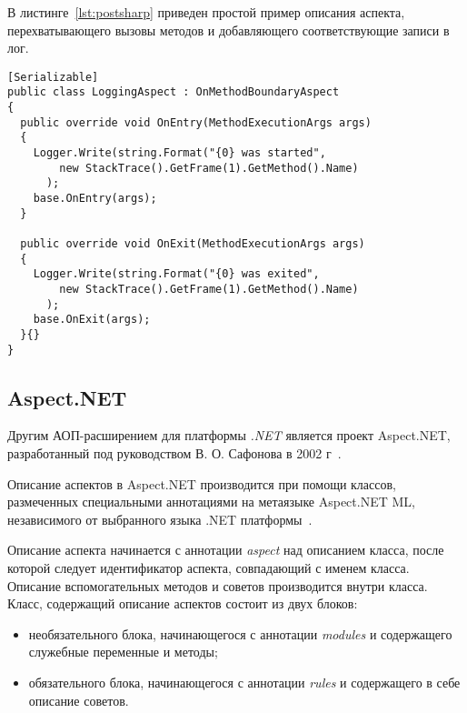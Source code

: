   В листинге~\ref{lst:postsharp} приведен простой пример описания аспекта, 
  перехватывающего вызовы методов и добавляющего соответствующие записи в лог.
  \begin{lstlisting}[style={java},  label={lst:postsharp}, caption={Пример 
  описания аспекта при помощи PostSharp.}]
[Serializable]
public class LoggingAspect : OnMethodBoundaryAspect
{
  public override void OnEntry(MethodExecutionArgs args)
  {
    Logger.Write(string.Format("{0} was started",
        new StackTrace().GetFrame(1).GetMethod().Name)
      );
    base.OnEntry(args);
  }
 
  public override void OnExit(MethodExecutionArgs args)
  {
    Logger.Write(string.Format("{0} was exited",
        new StackTrace().GetFrame(1).GetMethod().Name)
      );
    base.OnExit(args);
  }{}
}
  \end{lstlisting}
\subsection{Aspect.NET}
\label{sub:aspect_net_overwiev}
Другим АОП-расширением для платформы \textit{.NET} является проект Aspect.NET, разработанный под руководством В. О. Сафонова в 2002 г~\cite{aspect_net_logging}.

Описание аспектов в Aspect.NET производится при помощи классов, размеченных специальными аннотациями на метаязыке Aspect.NET ML, независимого от выбранного языка .NET платформы~\cite{aspect_net_safonov_2003,aspect_net_safonov_2004}.

Описание аспекта начинается с аннотации \textit{aspect} над описанием класса, после которой следует идентификатор аспекта, совпадающий с именем класса.
Описание вспомогательных методов и советов производится внутри класса.
Класс, содержащий описание аспектов состоит из двух блоков:
\begin{itemize}
  \item необязательного блока, начинающегося с аннотации \textit{modules} и содержащего служебные переменные и методы;
  \item обязательного блока, начинающегося с аннотации \textit{rules} и содержащего в себе описание советов.
\end{itemize}

